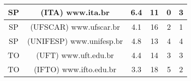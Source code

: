 \begin{center}
\begin{longtable}{|c|l|l|l|l|l|}
\hline
\multicolumn{1}{|c|}{SP} & \multicolumn{1}{c|}{(ITA) www.ita.br} & \multicolumn{1}{c|}{6.4} & \multicolumn{1}{c|}{11} & \multicolumn{1}{c|}{0} & \multicolumn{1}{c|}{3} \\ 
\hline
\multicolumn{1}{|c|}{SP} & \multicolumn{1}{c|}{(UFSCAR) www.ufscar.br} & \multicolumn{1}{c|}{4.1} & \multicolumn{1}{c|}{16} & \multicolumn{1}{c|}{2} & \multicolumn{1}{c|}{1} \\ 
\hline
\multicolumn{1}{|c|}{SP} & \multicolumn{1}{c|}{(UNIFESP) www.unifesp.br} & \multicolumn{1}{c|}{4.8} & \multicolumn{1}{c|}{13} & \multicolumn{1}{c|}{4} & \multicolumn{1}{c|}{4} \\ 
\hline
\multicolumn{1}{|c|}{TO} & \multicolumn{1}{c|}{(UFT) www.uft.edu.br} & \multicolumn{1}{c|}{4.4} & \multicolumn{1}{c|}{14} & \multicolumn{1}{c|}{3} & \multicolumn{1}{c|}{3} \\ 
\hline
\multicolumn{1}{|c|}{TO} & \multicolumn{1}{c|}{(IFTO) www.ifto.edu.br} & \multicolumn{1}{c|}{3.3} & \multicolumn{1}{c|}{18} & \multicolumn{1}{c|}{5} & \multicolumn{1}{c|}{2} \\ 
\hline
\end{longtable}
\end{center}

